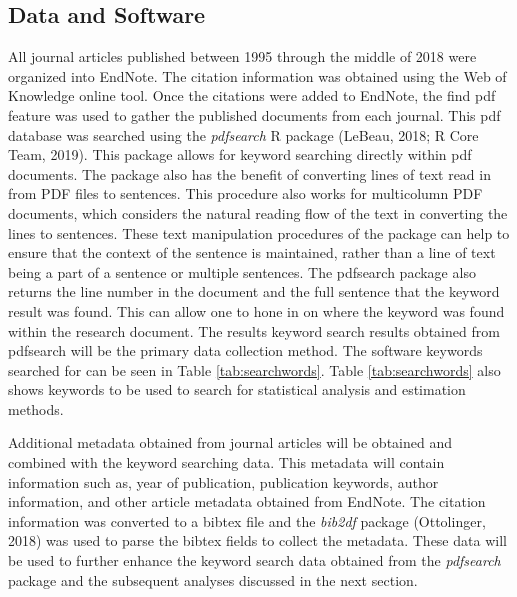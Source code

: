 \documentclass[
  english,
  ,man]{apa6}
\begin{document}
\hypertarget{data-and-software}{%
\subsection{Data and Software}\label{data-and-software}}

All journal articles published between 1995 through the middle of 2018 were organized into EndNote. The citation information was obtained using the Web of Knowledge online tool. Once the citations were added to EndNote, the find pdf feature was used to gather the published documents from each journal. This pdf database was searched using the \emph{pdfsearch} R package (LeBeau, 2018; R Core Team, 2019). This package allows for keyword searching directly within pdf documents. The package also has the benefit of converting lines of text read in from PDF files to sentences. This procedure also works for multicolumn PDF documents, which considers the natural reading flow of the text in converting the lines to sentences. These text manipulation procedures of the package can help to ensure that the context of the sentence is maintained, rather than a line of text being a part of a sentence or multiple sentences. The pdfsearch package also returns the line number in the document and the full sentence that the keyword result was found. This can allow one to hone in on where the keyword was found within the research document. The results keyword search results obtained from pdfsearch will be the primary data collection method. The software keywords searched for can be seen in Table \ref{tab:searchwords}. Table \ref{tab:searchwords} also shows keywords to be used to search for statistical analysis and estimation methods.

Additional metadata obtained from journal articles will be obtained and combined with the keyword searching data. This metadata will contain information such as, year of publication, publication keywords, author information, and other article metadata obtained from EndNote. The citation information was converted to a bibtex file and the \emph{bib2df} package (Ottolinger, 2018) was used to parse the bibtex fields to collect the metadata. These data will be used to further enhance the keyword search data obtained from the \emph{pdfsearch} package and the subsequent analyses discussed in the next section.
\end{document}
